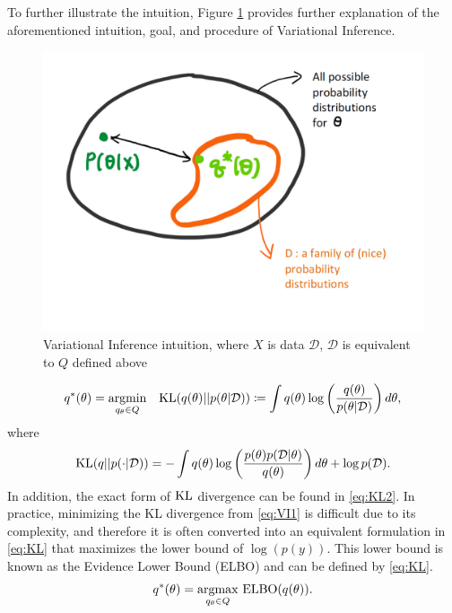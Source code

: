 To further illustrate the intuition, Figure \ref{fig:VIoptimization} provides further explanation of the aforementioned intuition, goal, and procedure of Variational Inference.
\begin{figure}[H]
	\center
	\includegraphics[scale = 0.2]{VIoptimization}
	\caption{Variational Inference intuition, where $X$ is data $\mathcal{D}$, $\mathcal{D}$ is equivalent to $Q$ defined above}
	\label{fig:VIoptimization}
\end{figure}
\begin{equation}
	\label{eq:VI1}
	q^{*}(\theta) = \underset{q_{\theta} \in Q}{\operatorname{argmin}} \quad \textnormal{KL}(q(\theta)||p(\theta|\mathcal{D})) \coloneqq \int q(\theta)\log\left(\frac{q(\theta)}{p(\theta|\mathcal{D})}\right)d\theta,
\end{equation}
\noindent where
\begin{equation}
	\label{eq:KL2}
	\textnormal{KL}(q||p(\cdot|\mathcal{D})) = - \int q(\theta)\log\left(\frac{p(\theta)p(\mathcal{D}|\theta)}{q(\theta)}\right) d\theta + \log p(\mathcal{D}).
\end{equation}
In addition, the exact form of $\textnormal{KL}$ divergence can be found in \autoref{eq:KL2}.
In practice, minimizing the KL divergence from \autoref{eq:VI1} is difficult due to its complexity, and therefore it is often converted into an equivalent formulation in \autoref{eq:KL} that maximizes the lower bound of $\log(p(y))$. This lower bound is known as the Evidence Lower Bound (ELBO) and can be defined by \autoref{eq:KL}.
\begin{equation}
	\label{eq:KL}
	q^*(\theta) = \underset{q_{\theta} \in Q}{\operatorname{ argmax}} \textnormal{ ELBO}(q(\theta)).
\end{equation}
